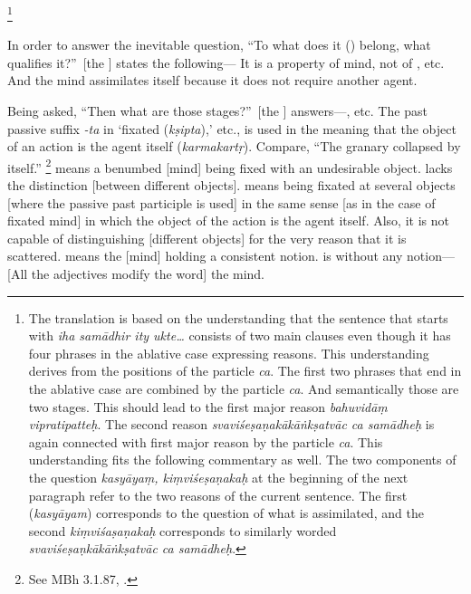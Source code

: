   \footnote{The translation is based on the understanding that the sentence that starts with \emph{iha samādhir ity ukte\ldots} consists of two main clauses even though it has four phrases in the ablative case expressing reasons.  This understanding derives from the positions of the particle \emph{ca}.  The first two phrases that end in the ablative case are combined by the particle \emph{ca}.  And semantically those are two stages.  This should lead to the first major reason \emph{bahuvidāṃ vipratipatteḥ}.  The second reason \emph{svaviśeṣaṇakākāṅkṣatvāc ca samādheḥ} is again connected with first major reason by the particle \emph{ca}.  This understanding fits the following commentary as well.  The two components of the question \emph{kasyāyaṃ, kiṃviśeṣaṇakaḥ} at the beginning of the next paragraph refer to the two reasons of the current sentence.  The first (\emph{kasyāyam}) corresponds to the question of what is assimilated, and the second \emph{kiṃviśaṣaṇakaḥ} corresponds to similarly worded \emph{svaviśeṣaṇkākāṅkṣatvāc ca samādheḥ}.%
  }

In%
 order to answer the inevitable question, ``To what does
it (\samadhi) belong, what qualifies it?''\ [the \Bhasyakara] states the following---  It is a property of mind, not of \atman, etc.  And the mind assimilates itself because it does not require another agent.%

Being%
 asked, ``Then what are those stages?''\ [the \Bhasyakara] answers---, etc.  The past passive suffix \emph{-ta} in `fixated (\emph{kṣipta}),' etc., is used in the meaning that the object of an action is the agent itself (\emph{karmakartṛ}).  Compare, ``The granary collapsed by itself.''%
  \footnote{See MBh 3.1.87, \citet[nn.~22--24]{wezler:yvi1}.%
  }  %
 means a benumbed [mind] being fixed with an undesirable object.   lacks the distinction [between different objects].   means being fixated at several objects [where the passive past participle is used] in the same sense [as in the case of fixated mind] in which the object of the action is the agent itself.  Also, it is not capable of distinguishing [different objects] for the very reason that it is scattered.   means the [mind] holding a consistent notion.   is without any notion---[All the adjectives modify the word] the mind.%

